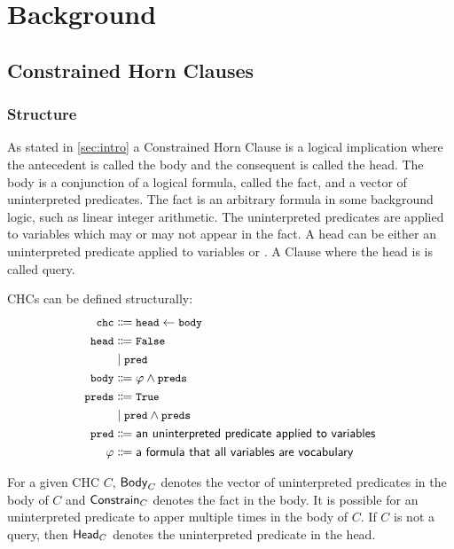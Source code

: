 \section{Background}
\label{sec:background}

\subsection{Constrained Horn Clauses}
\label{sec:chcs}

\subsubsection{Structure}
As stated in \autoref{sec:intro} a Constrained Horn Clause is a
logical implication where the antecedent is called the body and the
consequent is called the head.
%
The body is a conjunction of a logical formula, called the fact,
and a vector of uninterpreted predicates. The fact is an arbitrary
formula in some background logic, such as linear integer arithmetic.
%
The uninterpreted predicates are applied to variables which may or may
not appear in the fact.
%
A head can be either an uninterpreted predicate applied to variables or .
%
A Clause where the head is  is called query.
\begin{defn}
  CHCs can be defined structurally:
\begin{align*}
  \cc{chc} &\Coloneqq \cc{head} \gets \cc{body} \\
  \cc{head} &\Coloneqq \cc{False} \\&\mid \cc{pred}  \\
  \cc{body} &\Coloneqq \varphi \wedge \cc{preds} \\
  \cc{preds} &\Coloneqq \cc{True} \\&\mid \cc{pred} \wedge \cc{preds} \\
  \cc{pred} &\Coloneqq \textsf{an uninterpreted predicate applied to variables} \\
  \varphi &\Coloneqq \textsf{a formula that all variables are vocabulary} \\
\end{align*}
\end{defn}
%
For a given CHC $C$, $\mathsf{Body}_{C}$ denotes the vector of uninterpreted
predicates in the body of $C$ and $\mathsf{Constrain}_{C}$ denotes the fact in the
body.
%
It is possible for an uninterpreted predicate to apper multiple times
in the body of $C$.
%
If $C$ is not a query, then $\mathsf{Head}_{C}$ denotes the uninterpreted
predicate in the head.
%

